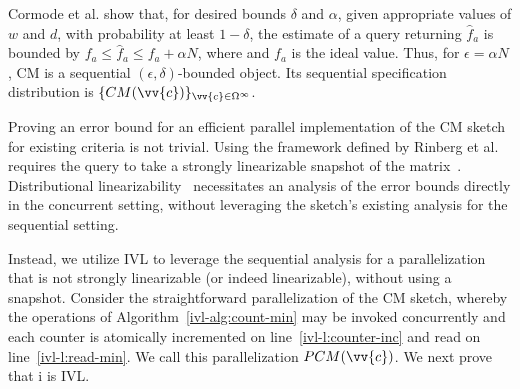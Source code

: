 Cormode et al. show that, for desired bounds $\delta$ and $\alpha$, given appropriate values of $w$ and $d$, with probability
at least $1-\delta$, the estimate of a query returning $\hat{f}_a$ is bounded by $f_a \leq \hat{f}_a \leq f_a + \alpha N$,
where  and $f_a$ is the ideal value.
Thus, for $\epsilon= \alpha N$, CM is a sequential $(\epsilon, \delta)$-bounded
object. Its sequential specification distribution is $\{CM(\vv{c})\}_{\vv{c} \in \Omega^\infty}$.


Proving an error bound for an efficient parallel implementation of the CM sketch for existing criteria is not trivial.
Using the framework defined by Rinberg et al.~\cite{rinberg2019fast} requires the query to take a
strongly linearizable snapshot of the matrix~\cite{ovens2019strongly}.
Distributional linearizability~\cite{alistarh2018distributionally} necessitates an analysis of the error bounds
directly in the concurrent setting, without leveraging the sketch's existing analysis for the sequential setting.

Instead, we utilize IVL to leverage the sequential analysis for a parallelization that
is not strongly linearizable (or indeed linearizable), without using a
snapshot. Consider the straightforward parallelization of the CM sketch,
whereby the operations of Algorithm~\ref{ivl-alg:count-min} may be invoked concurrently and each counter is atomically incremented  on
line~\ref{ivl-l:counter-inc} and read on line~\ref{ivl-l:read-min}. We call this parallelization $PCM(\vv{c})$. We next
prove that i is IVL.%


